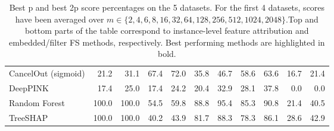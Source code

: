 \begin{table}[h!]
{{\begin{tabular}{lrrrrrrrrrr}
CancelOut (sigmoid) & 21.2 & 31.1 & 67.4 & 72.0 & 35.8 & 46.7 & 58.6 & 63.6 & 16.7 & 21.4 \\
DeepPINK & 17.4 & 25.0 & 17.4 & 24.2 & 20.4 & 32.9 & 28.1 & 37.8 & 0.0 & 0.0 \\
Random Forest & 100.0 & 100.0 & 54.5 & 59.8 & 88.8 & 95.4 & 85.3 & 90.8 & 21.4 & 40.5 \\
TreeSHAP & 100.0 & 100.0 & 40.2 & 43.9 & 81.7 & 88.3 & 78.3 & 86.1 & 28.6 & 42.9 \\
\bottomrule
\end{tabular}}}{}
\caption{Best p and best 2p score percentages on the 5 datasets. For the first 4 datasets, scores have been averaged over $m \in \{2, 4, 6, 8, 16, 32, 64, 128, 256, 512, 1024, 2048\}$.Top and bottom parts of the table correspond to instance-level feature attribution and embedded/filter FS methods, respectively. Best performing methods are highlighted in bold.}
\end{table}
